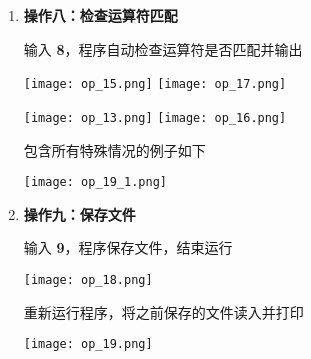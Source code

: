 \begin{enumerate}
\begin{figure*}[htbp]
                \end{figure*}
            \newpage
            \item \textbf{操作八：检查运算符匹配}
                \par 输入 \textbf{8}，程序自动检查运算符是否匹配并输出
                \begin{figure*}[htbp]
                    \centering
                    \texttt{[image: op\_15.png]}
                    \texttt{[image: op\_17.png]}
                \end{figure*}
                \begin{figure*}[htbp]
                    \centering
                    \texttt{[image: op\_13.png]}
                    \texttt{[image: op\_16.png]}
                \end{figure*}
                \par 包含所有特殊情况的例子如下
                \begin{figure*}[htbp]
                    \centering
                    \texttt{[image: op\_19\_1.png]}
                \end{figure*}
            \item \textbf{操作九：保存文件}
                \par 输入 \textbf{9}，程序保存文件，结束运行
                \begin{figure*}[htbp]
                    \centering
                    \texttt{[image: op\_18.png]}
                \end{figure*}
                \par 重新运行程序，将之前保存的文件读入并打印
                \begin{figure*}[htbp]
                    \centering
                    \texttt{[image: op\_19.png]}
                \end{figure*}
        \end{enumerate}
         